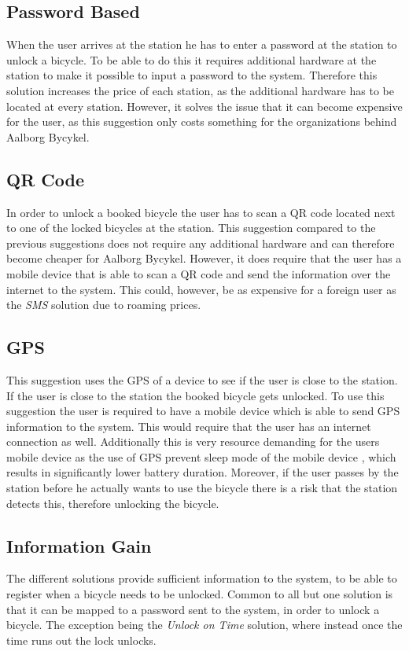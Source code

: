 \subsection{Password Based}
When the user arrives at the station he has to enter a password at the station to unlock a bicycle.
To be able to do this it requires additional hardware at the station to make it possible to input a password to the system.
Therefore this solution increases the price of each station, as the additional hardware has to be located at every station.
However, it solves the issue that it can become expensive for the user, as this suggestion only costs something for the organizations behind Aalborg Bycykel.

\subsection{QR Code}
In order to unlock a booked bicycle the user has to scan a QR code located next to one of the locked bicycles at the station.
This suggestion compared to the previous suggestions does not require any additional hardware and can therefore become cheaper for Aalborg Bycykel.
However, it does require that the user has a mobile device that is able to scan a QR code and send the information over the internet to the system. This could, however, be as expensive for a foreign user as the \textit{SMS} solution due to roaming prices.

\subsection{GPS}
This suggestion uses the GPS of a device to see if the user is close to the station.
If the user is close to the station the booked bicycle gets unlocked.
To use this suggestion the user is required to have a mobile device which is able to send GPS information to the system.
This would require that the user has an internet connection as well.
Additionally this is very resource demanding for the users mobile device as the use of GPS prevent sleep mode of the mobile device \citep{misc:gpsbatteryusage}, which results in significantly lower battery duration.
Moreover, if the user passes by the station before he actually wants to use the bicycle there is a risk that the station detects this, therefore unlocking the bicycle.

\subsection{Information Gain}
The different solutions provide sufficient information to the system, to be able to register when a bicycle needs to be unlocked.
Common to all but one solution is that it can be mapped to a password sent to the system, in order to unlock a bicycle.
The exception being the \textit{Unlock on Time} solution, where instead once the time runs out the lock unlocks.


